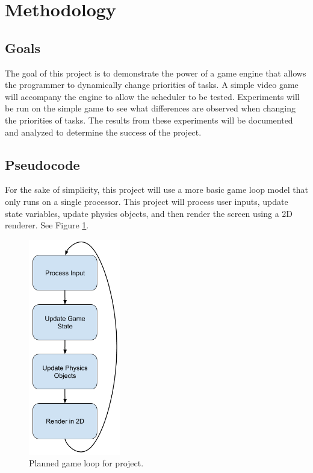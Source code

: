 \documentclass[a4paper, 12pt]{article}
\begin{document}
\section{Methodology}
    \subsection{Goals}

        The goal of this project is to demonstrate the power of a game engine that allows the programmer to dynamically change priorities of tasks. A simple video game will accompany the engine to allow the scheduler to be tested. Experiments will be run on the simple game to see what differences are observed when changing the priorities of tasks. The results from these experiments will be documented and analyzed to determine the success of the project. \\

    \subsection{Pseudocode}
        For the sake of simplicity, this project will use a more basic game loop model that only runs on a single processor. This project will process user inputs, update state variables, update physics objects, and then render the screen using a 2D renderer. See Figure \ref{my_loop}.

        \begin{figure}[H]
            \includegraphics[width=4cm]{my_loop.png}
            \centering
            \caption{Planned game loop for project.}
            \label{my_loop}
        \end{figure}
\end{document}

